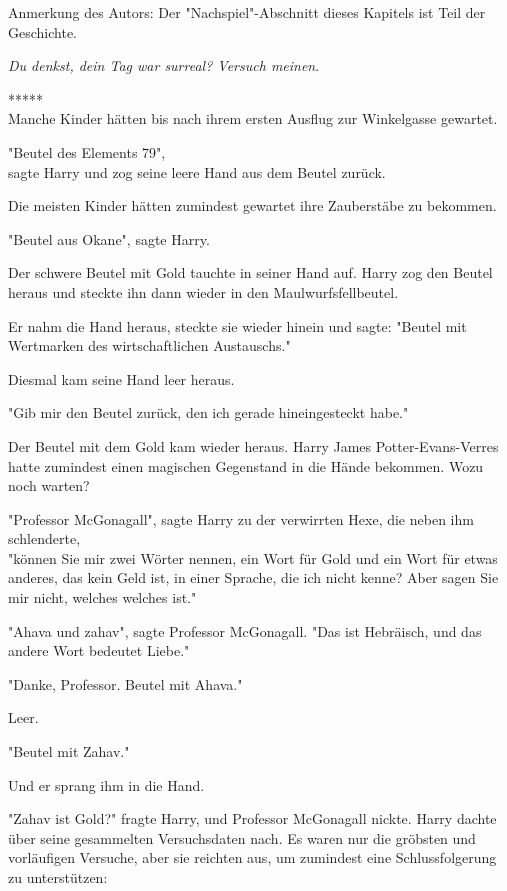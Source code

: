

\hypertarget{der-planungsirrtum}{%

Anmerkung des Autors: Der "Nachspiel"-Abschnitt dieses Kapitels ist Teil der Geschichte.

\emph{Du denkst, dein Tag war surreal? Versuch meinen}.

*****\\ Manche Kinder hätten bis nach ihrem ersten Ausflug zur Winkelgasse gewartet.

"Beutel des Elements 79",\\ sagte Harry und zog seine leere Hand aus dem Beutel zurück.

Die meisten Kinder hätten zumindest gewartet ihre Zauberstäbe zu bekommen.

"Beutel aus Okane", sagte Harry.

Der schwere Beutel mit Gold tauchte in seiner Hand auf. Harry zog den Beutel heraus und steckte ihn dann wieder in den Maulwurfsfellbeutel.

Er nahm die Hand heraus, steckte sie wieder hinein und sagte: "Beutel mit Wertmarken des wirtschaftlichen Austauschs."

Diesmal kam seine Hand leer heraus.

"Gib mir den Beutel zurück, den ich gerade hineingesteckt habe."

Der Beutel mit dem Gold kam wieder heraus. Harry James Potter-Evans-Verres hatte zumindest einen magischen Gegenstand in die Hände bekommen. Wozu noch warten?

"Professor McGonagall", sagte Harry zu der verwirrten Hexe, die neben ihm schlenderte,\\ "können Sie mir zwei Wörter nennen, ein Wort für Gold und ein Wort für etwas anderes, das kein Geld ist, in einer Sprache, die ich nicht kenne? Aber sagen Sie mir nicht, welches welches ist."

"Ahava und zahav", sagte Professor McGonagall. "Das ist Hebräisch, und das andere Wort bedeutet Liebe."

"Danke, Professor. Beutel mit Ahava."

Leer.

"Beutel mit Zahav."

Und er sprang ihm in die Hand.

"Zahav ist Gold?" fragte Harry, und Professor McGonagall nickte. Harry dachte über seine gesammelten Versuchsdaten nach. Es waren nur die gröbsten und vorläufigen Versuche, aber sie reichten aus, um zumindest eine Schlussfolgerung zu unterstützen:

}

